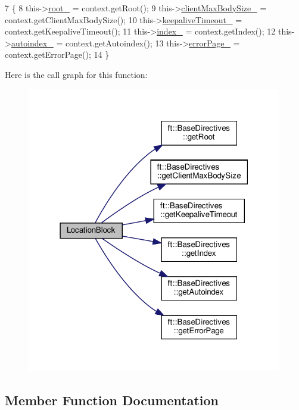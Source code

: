 \begin{DoxyCode}
7     \{
8         this->\hyperlink{classft_1_1_base_directives_abb1eaf0bba10b90172d6152e69457dc7}{root\_} = context.getRoot();
9         this->\hyperlink{classft_1_1_base_directives_ad65c2594d2a90ca065d410dfd4066a19}{clientMaxBodySize\_} = context.getClientMaxBodySize();
10         this->\hyperlink{classft_1_1_base_directives_aa1f5f394b428d0d18765a9b9e14e648f}{keepaliveTimeout\_} = context.getKeepaliveTimeout();
11         this->\hyperlink{classft_1_1_base_directives_a6ba30626837f300201cd32c35d50aa49}{index\_} = context.getIndex();
12         this->\hyperlink{classft_1_1_base_directives_a4ebffbe32f50a462afa139c6f03c1a4f}{autoindex\_} = context.getAutoindex();
13         this->\hyperlink{classft_1_1_base_directives_a5c0d388109f086503961de84fe3fce90}{errorPage\_} = context.getErrorPage();
14     \}
\end{DoxyCode}
Here is the call graph for this function\+:
\nopagebreak
\begin{figure}[H]
\begin{center}
\leavevmode
\includegraphics[width=316pt]{classft_1_1_location_block_a28cbc9fd5dfde06685c8f7be5b6e0a4a_cgraph}
\end{center}
\end{figure}


\subsection{Member Function Documentation}
\mbox{\label{classft_1_1_base_directives_a36d96dc74e650162c25a325813130ab2}} 
